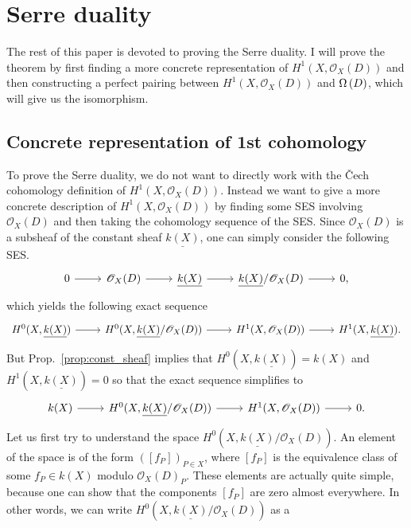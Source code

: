 \section{Serre duality}
The rest of this paper is devoted to proving the Serre duality.
I will prove the theorem by first finding a more concrete representation of
$H^{1}(X,\mathscr{O}_X(D))$ and then constructing a perfect pairing between
$H^{1}(X,\mathscr{O}_X(D))$ and $\Omega\left(D\right)$,
which will give us the isomorphism.

\subsection{Concrete representation of 1st cohomology}
To prove the Serre duality, we do not want to directly work with the \v Cech
cohomology definition of $H^{1}(X,\mathscr{O}_X(D))$.
Instead we want to give a more concrete description of
$H^{1}(X,\mathscr{O}_X(D))$ by finding some SES involving $\mathscr{O}_X(D)$
and then taking the cohomology sequence of the SES. Since $\mathscr{O}_X(D)$ is
a subsheaf of the constant sheaf $\underline{k(X)}$, one can simply consider
the following SES.
\[
  \begin{tikzcd}
    0\rar & \mathscr{O}_X(D)\rar & \underline{k(X)}\rar
    & \underline{k(X)}/\mathscr{O}_X(D)\rar & 0,
  \end{tikzcd}
\]
which yields the following exact sequence
\[
  \begin{tikzcd}
    H^{0}(X,\underline{k(X)})\rar & H^{0}(X,\underline{k(X)}
    /\mathscr{O}_X(D))\rar & H^{1}(X,\mathscr{O}_X(D))\rar
    & H^{1}(X,\underline{k(X)}).
  \end{tikzcd}
\]
But Prop.~\ref{prop:const_sheaf} implies that
$H^{0}(X,\underline{k(X)})=k(X)$ and $H^{1}(X,\underline{k(X)})=0$
so that the exact sequence simplifies to
\begin{equation}\label{eq:repartition_ses}
  \begin{tikzcd}
    k(X)\rar & H^{0}(X,\underline{k(X)}/\mathscr{O}_X(D))\rar
    & H^{1}(X,\mathscr{O}_X(D))\rar & 0.
  \end{tikzcd}
\end{equation}
Let us first try to understand the space
$H^{0}(X,\underline{k(X)}/\mathscr{O}_X(D))$. An element of the space
is of the form $([f_{P}])_{P\in X}$, where $[f_{P}]$ is the equivalence
class of some $f_{P}\in k(X)$ modulo $\mathscr{O}_X(D)_{P}$.
These elements are actually quite simple, because one can show that the
components $[f_{P}]$ are zero almost everywhere.
In other words, we can write $H^{0}(X,\underline{k(X)}/\mathscr{O}_X(D))$ as a
